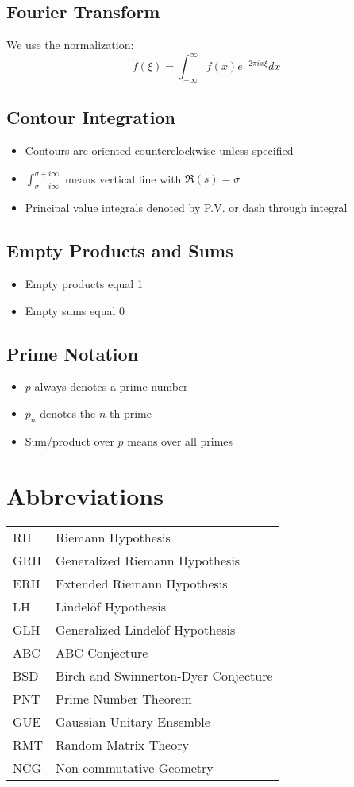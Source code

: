 \subsection{Fourier Transform}
We use the normalization:
\[
\hat{f}(\xi) = \int_{-\infty}^{\infty} f(x) e^{-2\pi i x\xi} dx
\]

\subsection{Contour Integration}
\begin{itemize}
\item Contours are oriented counterclockwise unless specified
\item $\int_{\sigma - i\infty}^{\sigma + i\infty}$ means vertical line with $\Re(s) = \sigma$
\item Principal value integrals denoted by P.V. or dash through integral
\end{itemize}

\subsection{Empty Products and Sums}
\begin{itemize}
\item Empty products equal 1
\item Empty sums equal 0
\end{itemize}

\subsection{Prime Notation}
\begin{itemize}
\item $p$ always denotes a prime number
\item $p_n$ denotes the $n$-th prime
\item Sum/product over $p$ means over all primes
\end{itemize}

\section{Abbreviations}

\begin{tabular}{ll}
RH & Riemann Hypothesis \\
GRH & Generalized Riemann Hypothesis \\
ERH & Extended Riemann Hypothesis \\
LH & Lindelöf Hypothesis \\
GLH & Generalized Lindelöf Hypothesis \\
ABC & ABC Conjecture \\
BSD & Birch and Swinnerton-Dyer Conjecture \\
PNT & Prime Number Theorem \\
GUE & Gaussian Unitary Ensemble \\
RMT & Random Matrix Theory \\
NCG & Non-commutative Geometry \\
\end{tabular}
